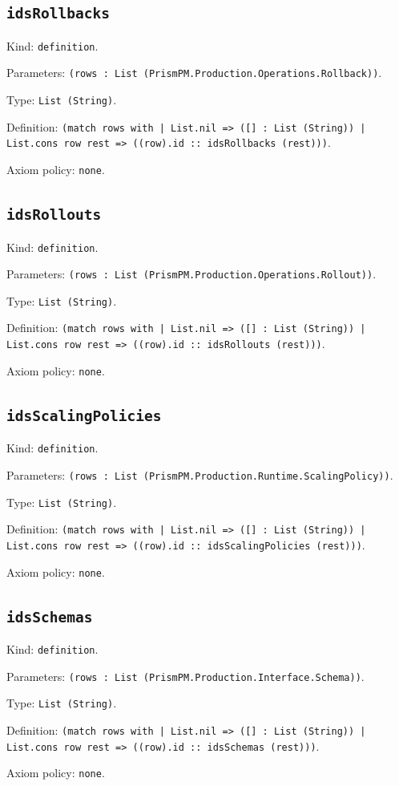 \documentclass[11pt]{article}
\begin{document}
\subsection*{\texttt{idsRollbacks}}
\noindent Kind: \texttt{definition}.\par
\noindent Parameters: \texttt{(rows : List (PrismPM.Production.Operations.Rollback))}.\par
\noindent Type: \texttt{List (String)}.\par
\noindent Definition: \texttt{(match rows with | List.nil => ([] : List (String)) | List.cons row rest => ((row).id :: idsRollbacks (rest)))}.\par
\noindent Axiom policy: \texttt{none}.\par
\subsection*{\texttt{idsRollouts}}
\noindent Kind: \texttt{definition}.\par
\noindent Parameters: \texttt{(rows : List (PrismPM.Production.Operations.Rollout))}.\par
\noindent Type: \texttt{List (String)}.\par
\noindent Definition: \texttt{(match rows with | List.nil => ([] : List (String)) | List.cons row rest => ((row).id :: idsRollouts (rest)))}.\par
\noindent Axiom policy: \texttt{none}.\par
\subsection*{\texttt{idsScalingPolicies}}
\noindent Kind: \texttt{definition}.\par
\noindent Parameters: \texttt{(rows : List (PrismPM.Production.Runtime.ScalingPolicy))}.\par
\noindent Type: \texttt{List (String)}.\par
\noindent Definition: \texttt{(match rows with | List.nil => ([] : List (String)) | List.cons row rest => ((row).id :: idsScalingPolicies (rest)))}.\par
\noindent Axiom policy: \texttt{none}.\par
\subsection*{\texttt{idsSchemas}}
\noindent Kind: \texttt{definition}.\par
\noindent Parameters: \texttt{(rows : List (PrismPM.Production.Interface.Schema))}.\par
\noindent Type: \texttt{List (String)}.\par
\noindent Definition: \texttt{(match rows with | List.nil => ([] : List (String)) | List.cons row rest => ((row).id :: idsSchemas (rest)))}.\par
\noindent Axiom policy: \texttt{none}.\par
\end{document}
